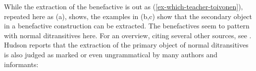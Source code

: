 While the extraction of the benefactive is out as (\ref{ex-which-teacher-toivonen}), repeated here
as (a), shows, the examples in (b,c) show that the secondary object in a benefactive construction can be extracted.
\eal
\label{ex-extraction-secondary-object}
\zl
The benefactives seem to pattern with normal ditransitives here. For an overview, citing several
other sources, see . Hudson reports that the extraction of the primary object of normal ditransitives is also
judged as marked or even ungrammatical by many authors and informants:
\eal
\judgewidth{\%}
\zl

